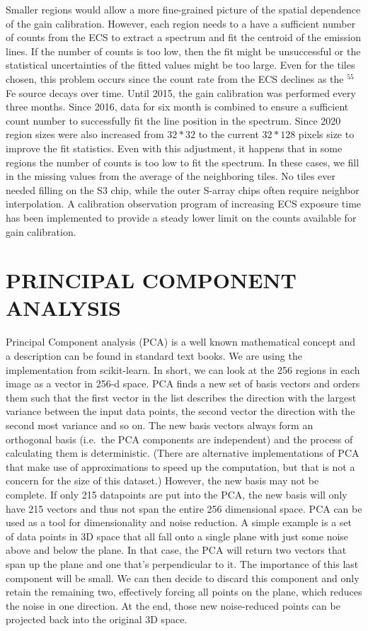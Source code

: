 \documentclass[]{spie}  %
\begin{document}
Smaller regions would allow a more fine-grained picture of the spatial dependence of the gain calibration. However, each region needs to a have a sufficient number of counts from the ECS to extract a spectrum and fit the centroid of the emission lines. If the number of counts is too low, then the fit might be unsuccessful or the statistical uncertainties of the fitted values might be too large. Even for the tiles chosen, this problem occurs since the count rate from the ECS declines as the $^{55}$Fe source decays over time. Until 2015, the gain calibration was performed every three months. Since 2016, data for six month is combined to ensure a sufficient count number to successfully fit the line position in the spectrum. Since 2020 region sizes were also increased from $32*32$ to the current $32*128$ pixels size to improve the fit statistics. Even with this adjustment, it happens that in some regions the number of counts is too low to fit the spectrum. In these cases, we fill in the missing values from the average of the neighboring tiles. No tiles ever needed filling on the S3 chip, while the outer S-array chips often require neighbor interpolation. A calibration observation program of increasing ECS exposure time has been implemented to provide a steady lower limit on the counts available for gain calibration.

\section{PRINCIPAL COMPONENT ANALYSIS}
Principal Component analysis (PCA) is a well known mathematical concept and a description can be found in standard text books. We are using the implementation from scikit-learn\cite{scikit-learn}. In short, we can look at the 256 regions in each image as a vector in 256-d space. PCA finds a new set of basis vectors and orders them such that the first vector in the list describes the direction with the largest variance between the input data points, the second vector the direction with the second most variance and so on. The new basis vectors always form an orthogonal basis (i.e.\ the PCA components are independent) and the process of calculating them is deterministic. (There are alternative implementations of PCA that make use of approximations to speed up the computation, but that is not a concern for the size of this dataset.) However, the new basis may not be complete. If only 215 datapoints are put into the PCA, the new basis will only have 215 vectors and thus not span the entire 256 dimensional space. PCA can be used as a tool for dimensionality and noise reduction. A simple example is a set of data points in 3D space that all fall onto a single plane with just some noise above and below the plane. In that case, the PCA will return two vectors that span up the plane and one that's perpendicular to it. The importance of this last component will be small. We can then decide to discard this component and only retain the remaining two, effectively forcing all points on the plane, which reduces the noise in one direction. At the end, those new noise-reduced points can be projected back into the original 3D space.
\end{document}
